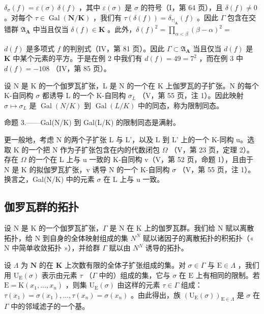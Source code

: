 \(\delta_{\sigma}(f) = \varepsilon(\sigma)\ \delta(f)\) ，其中 \(\varepsilon(\sigma)\) 是 \(\sigma\) 的符号（I，第 64 页），且 \(\delta(f) \neq 0\) 。对每个 \(\tau \in \operatorname{Gal}(\mathbf{N}/\mathbf{K})\) ，我们有 \(\tau(\delta(f)) = \delta_{\tau|_{\mathbf{A}}}(f)\) 。因此 \(\Gamma\) 包含在交错群 \(\mathfrak{A}_{\mathbf{A}}\) 中当且仅当 \(\delta(f) \in \mathbf{K}\) 。此外，\(\delta(f)^2 = \prod_{\alpha < \beta} (\beta - \alpha)^2 =\)

\(d(f)\) 是多项式 \(f\) 的判别式（IV，第 81 页）。因此 \(\Gamma \subset \mathfrak{A}_{\mathbf{A}}\) 当且仅当 \(d(f)\) 是 \(\mathbf{K}\) 中某个元素的平方。于是在例 2 中我们有 \(d(f) = 49 = 7^2\) ，而在例 3 中 \(d(f) = -108\) （IV，第 85 页）。

设 N 是 K 的一个伽罗瓦扩张，L 是 N 的一个在 K 上伽罗瓦的子扩张。N 的每个 K-自同构 \(\sigma\) 都诱导 L 的一个 K-自同构 \(\sigma_{L}\) （V，第 55 页，注 1）。因此映射 \(\sigma \mapsto \sigma_{L}\) 是 \(\operatorname{Gal}(N/K)\) 到 \(\operatorname{Gal}(L/K)\) 中的同态，称为限制同态。

命题 3.——Gal(N/K) 到 Gal(L/K) 的限制同态是满射。

更一般地，考虑 N 的两个子扩张 L 与 L'，以及 L 到 L' 上的一个 K-同构 u。选取 K 的一个把 N 作为子扩张包含在内的代数闭包 \(\Omega\) （V，第 23 页，定理 2）。存在 \(\Omega\) 的一个在 L 上与 u 一致的 K-自同构 v（V，第 52 页，命题 1），且由于 N 是 K 的拟伽罗瓦扩张，v 诱导 N 的一个 K-自同构 \(\sigma\) （V，第 55 页，注 1）。换言之，Gal(N/K) 中的元素 \(\sigma\) 在 L 上与 u 一致。

\subsection{伽罗瓦群的拓扑}

设 N 是 K 的一个伽罗瓦扩张，\(\Gamma\) 是 N 在 K 上的伽罗瓦群。我们给 N 赋以离散拓扑，给 N 到自身的全体映射组成的集 \(N^{N}\) 赋以诸因子的离散拓扑的积拓扑（« N 中简单收敛拓扑 »），并给群 \(\Gamma\) 赋以由 \(N^{N}\) 诱导的拓扑。

设 \(\Lambda\) 为 \(\mathbf{N}\) 的在 \(\mathbf{K}\) 上次数有限的全体子扩张组成的集。对 \(\sigma \in \Gamma\) 与 \(\mathrm{E} \in \Lambda\) ，我们用 \(\mathrm{U}_{\mathrm{E}}(\sigma)\) 表示由元素 \(\tau\) （\(\Gamma\) 中的）组成的集，它与 \(\sigma\) 在 \(\mathrm{E}\) 上有相同的限制。若 \(\mathrm{E} = \mathrm{K}(x_1, \ldots, x_n)\) ，则集 \(\mathrm{U}_{\mathrm{E}}(\sigma)\) 由这样的元素 \(\tau \in \Gamma\) 组成：\(\tau(x_1) = \sigma(x_1), \ldots, \tau(x_n) = \sigma(x_n)\) 。由此得出，族 \((\mathrm{U}_{\mathrm{E}}(\sigma))_{\mathrm{E} \in \Lambda}\) 是 \(\sigma\) 在 \(\Gamma\) 中的邻域滤子的一个基。

